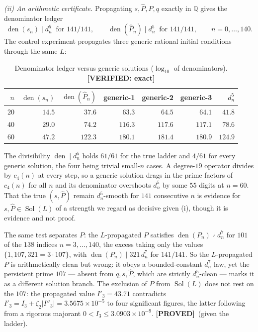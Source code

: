 \documentclass[11pt,reqno]{amsart}
\theoremstyle{plain}
\theoremstyle{definition}
\theoremstyle{remark}
\newcommand{\PROVED}{{\normalfont\sffamily\bfseries[PROVED]}}
\newcommand{\VER}[1]{{\normalfont\sffamily\bfseries[VERIFIED: #1]}}
\newcommand{\QQ}{\mathbb{Q}}
\DeclareMathOperator{\Sol}{Sol}
\DeclareMathOperator{\den}{den}
\newcommand{\Phat}{\widehat{P}}
\begin{document}
\emph{(ii) An arithmetic certificate.} Propagating $s,\Phat,P,q$ exactly in $\QQ$ gives the
denominator ledger
\[
  \den(s_n)\mid d_n^{5}\ \text{ for } 141/141,\qquad
  \den(\Phat_n)\mid d_n^{5}\ \text{ for } 141/141,\qquad n=0,\dots,140 .
\]
The control experiment propagates three generic rational initial conditions through the same $L$:

\begin{table}[h]
\centering
\caption{Denominator ledger versus generic solutions ($\log_{10}$ of denominators).
\VER{exact}}
\label{tab:ledger}
\begin{tabular}{rrrrrrr}
\toprule
$n$ & $\den(s_n)$ & $\den(\Phat_n)$ & generic-1 & generic-2 & generic-3 & $d_n^5$\\
\midrule
$20$ & $14.5$ & $37.6$ & $63.3$ & $64.5$ & $64.1$ & $41.8$\\
$40$ & $29.0$ & $74.2$ & $116.3$ & $117.6$ & $117.1$ & $78.6$\\
$60$ & $47.2$ & $122.3$ & $180.1$ & $181.4$ & $180.9$ & $124.9$\\
\bottomrule
\end{tabular}
\end{table}

The divisibility $\den\mid d_n^5$ holds $61/61$ for the true ladder and $4/61$ for every generic
solution, the four being trivial small-$n$ cases. A degree-$19$ operator divides by $c_4(n)$ at
every step, so a generic solution drags in the prime factors of $c_4(n)$ for all $n$ and its
denominator overshoots $d_n^5$ by some $55$ digits at $n=60$. That the true $(s,\Phat)$ remain
$d_n^5$-smooth for $141$ consecutive $n$ is evidence for $s,\Phat\in\Sol(L)$ of a strength we
regard as decisive given (i), though it is evidence and not proof.

The same test separates $P$: the $L$-propagated $P$ satisfies $\den(P_n)\nmid d_n^{7}$ for $101$
of the $138$ indices $n=3,\dots,140$, the excess taking only the values $\{1,107,321=3\cdot107\}$,
with $\den(P_n)\mid 321\,d_n^{7}$ for $141/141$. So the $L$-propagated $P$ is arithmetically
clean but wrong: it obeys a bounded-constant $d_n^7$ law, yet the persistent prime $107$ ---
absent from $q,s,\Phat$, which are strictly $d_n^5$-clean --- marks it as a different solution
branch. The exclusion of $P$ from $\Sol(L)$ does not rest on the $107$: the propagated value
$I'_3=43.71$ contradicts $I'_3=I_3+\zeta_2|I''_3|=3.5675\times10^{-5}$ to four significant
figures, the latter following from a rigorous majorant $0<I_3\le3.0903\times10^{-9}$.
\PROVED\ (given the ladder).
\end{document}
